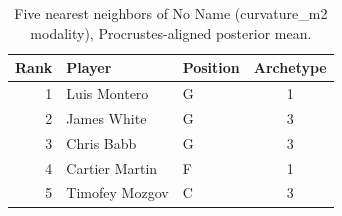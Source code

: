 \begin{table}[htbp]
  \centering\small
  \begin{tabular}{rllc}
    \toprule
    Rank & Player & Position & Archetype \\
    \midrule
    1 & Luis Montero & G & 1 \\
    2 & James White & G & 3 \\
    3 & Chris Babb & G & 3 \\
    4 & Cartier Martin & F & 1 \\
    5 & Timofey Mozgov & C & 3 \\
    \bottomrule
  \end{tabular}
  \caption{Five nearest neighbors of No Name (curvature_m2 modality), Procrustes-aligned posterior mean.}
  \label{tab:No_Name_neighbors_curvature_m2}
\end{table}

